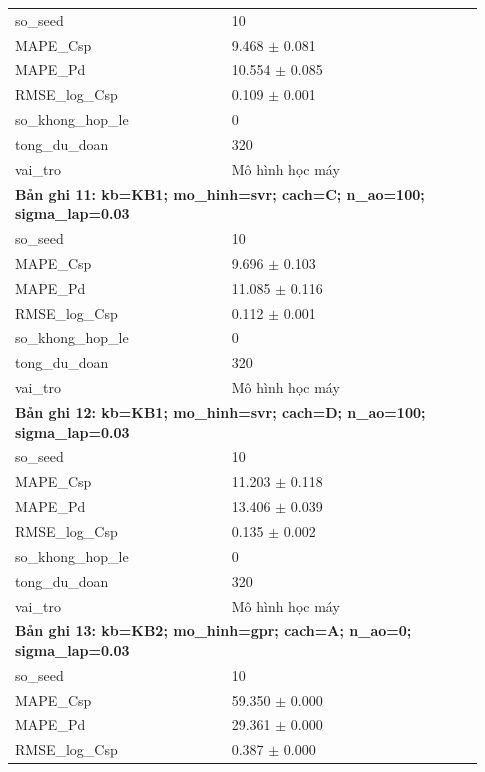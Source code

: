 \begin{longtable}{p{0.43\linewidth}p{0.50\linewidth}}
so\_\allowbreak seed & 10 \\
MAPE\_\allowbreak Csp & 9.468 $\pm$ 0.081 \\
MAPE\_\allowbreak Pd & 10.554 $\pm$ 0.085 \\
RMSE\_\allowbreak log\_\allowbreak Csp & 0.109 $\pm$ 0.001 \\
so\_\allowbreak khong\_\allowbreak hop\_\allowbreak le & 0 \\
tong\_\allowbreak du\_\allowbreak doan & 320 \\
vai\_\allowbreak tro & Mô hình học máy \\
\midrule
\multicolumn{2}{p{0.95\linewidth}}{\textbf{Bản ghi 11: kb=KB1; mo\_hinh=svr; cach=C; n\_ao=100; sigma\_lap=0.03}} \\
so\_\allowbreak seed & 10 \\
MAPE\_\allowbreak Csp & 9.696 $\pm$ 0.103 \\
MAPE\_\allowbreak Pd & 11.085 $\pm$ 0.116 \\
RMSE\_\allowbreak log\_\allowbreak Csp & 0.112 $\pm$ 0.001 \\
so\_\allowbreak khong\_\allowbreak hop\_\allowbreak le & 0 \\
tong\_\allowbreak du\_\allowbreak doan & 320 \\
vai\_\allowbreak tro & Mô hình học máy \\
\midrule
\multicolumn{2}{p{0.95\linewidth}}{\textbf{Bản ghi 12: kb=KB1; mo\_hinh=svr; cach=D; n\_ao=100; sigma\_lap=0.03}} \\
so\_\allowbreak seed & 10 \\
MAPE\_\allowbreak Csp & 11.203 $\pm$ 0.118 \\
MAPE\_\allowbreak Pd & 13.406 $\pm$ 0.039 \\
RMSE\_\allowbreak log\_\allowbreak Csp & 0.135 $\pm$ 0.002 \\
so\_\allowbreak khong\_\allowbreak hop\_\allowbreak le & 0 \\
tong\_\allowbreak du\_\allowbreak doan & 320 \\
vai\_\allowbreak tro & Mô hình học máy \\
\midrule
\multicolumn{2}{p{0.95\linewidth}}{\textbf{Bản ghi 13: kb=KB2; mo\_hinh=gpr; cach=A; n\_ao=0; sigma\_lap=0.03}} \\
so\_\allowbreak seed & 10 \\
MAPE\_\allowbreak Csp & 59.350 $\pm$ 0.000 \\
MAPE\_\allowbreak Pd & 29.361 $\pm$ 0.000 \\
RMSE\_\allowbreak log\_\allowbreak Csp & 0.387 $\pm$ 0.000 \\

\end{longtable}
